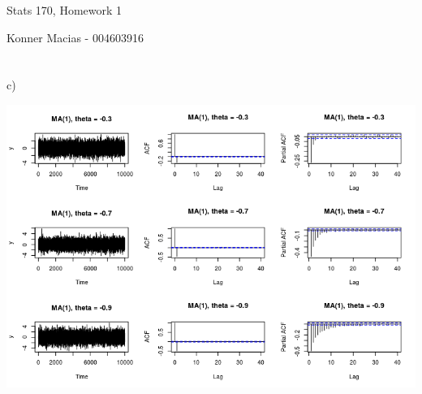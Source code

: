 \documentclass[11pt]{article}
\begin{document}
\centerline{\Large Stats 170, Homework 1}
\vspace{.5pc}
\centerline{\Large Konner Macias - 004603916}
\vspace{1.5pc}
\section{}
c) 
\begin{center}
	\includegraphics[scale=1]{plt1.png}
\end{center}
\end{document}
